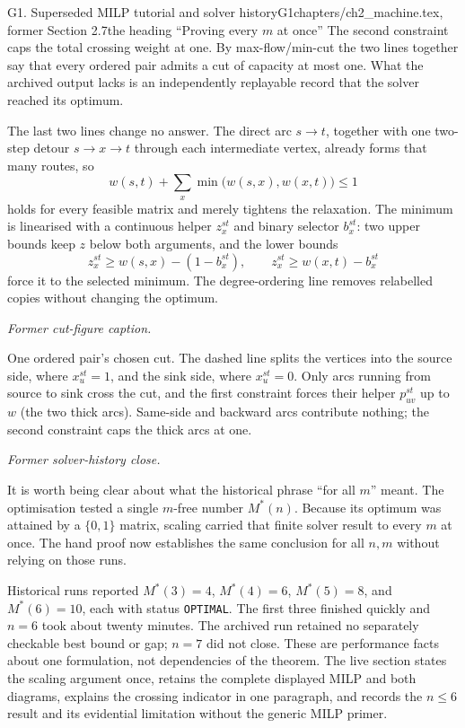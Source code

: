 \begin{offcutrewrite}{G1. Superseded MILP tutorial and solver history}{G1}{chapters/ch2\_machine.tex, former Section 2.7}{the heading ``Proving every $m$ at once''}
The second constraint caps the total crossing weight at one. By max-flow/min-cut the two lines together say that every ordered pair admits a cut of capacity at most one. What the archived output lacks is an independently replayable record that the solver reached its optimum.

The last two lines change no answer. The direct arc $s\to t$, together with one two-step detour $s\to x\to t$ through each intermediate vertex, already forms that many routes, so
\[
w(s,t)+\sum_x\min\bigl(w(s,x),w(x,t)\bigr)\le1
\]
holds for every feasible matrix and merely tightens the relaxation. The minimum is linearised with a continuous helper $z^{st}_x$ and binary selector $b^{st}_x$: two upper bounds keep $z$ below both arguments, and the lower bounds
\[
z^{st}_x\ge w(s,x)-(1-b^{st}_x),\qquad
z^{st}_x\ge w(x,t)-b^{st}_x
\]
force it to the selected minimum. The degree-ordering line removes relabelled copies without changing the optimum.

\noindent\emph{Former cut-figure caption.}

One ordered pair's chosen cut. The dashed line splits the vertices into the source side, where $x^{st}_u=1$, and the sink side, where $x^{st}_u=0$. Only arcs running from source to sink cross the cut, and the first constraint forces their helper $p^{st}_{uv}$ up to $w$ (the two thick arcs). Same-side and backward arcs contribute nothing; the second constraint caps the thick arcs at one.

\noindent\emph{Former solver-history close.}

It is worth being clear about what the historical phrase ``for all $m$'' meant. The optimisation tested a single $m$-free number $M^*(n)$. Because its optimum was attained by a $\{0,1\}$ matrix, scaling carried that finite solver result to every $m$ at once. The hand proof now establishes the same conclusion for all $n,m$ without relying on those runs.

Historical runs reported $M^*(3)=4$, $M^*(4)=6$, $M^*(5)=8$, and $M^*(6)=10$, each with status \texttt{OPTIMAL}. The first three finished quickly and $n=6$ took about twenty minutes. The archived run retained no separately checkable best bound or gap; $n=7$ did not close. These are performance facts about one formulation, not dependencies of the theorem.
\nowreads
The live section states the scaling argument once, retains the complete displayed MILP and both diagrams, explains the crossing indicator in one paragraph, and records the $n\le6$ result and its evidential limitation without the generic MILP primer.
\end{offcutrewrite}

